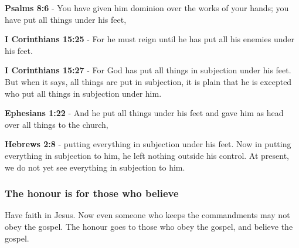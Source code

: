 \documentclass[11pt]{article}
\begin{document}
\textbf{Psalms 8:6} - You have given him dominion over the works of your hands; you have put all things under his feet,

\textbf{I Corinthians 15:25} - For he must reign until he has put all his enemies under his feet.

\textbf{I Corinthians 15:27} - For God has put all things in subjection under his feet. But when it says, all things are put in subjection, it is plain that he is excepted who put all things in subjection under him.

\textbf{Ephesians 1:22} - And he put all things under his feet and gave him as head over all things to the church,

\textbf{Hebrews 2:8} - putting everything in subjection under his feet. Now in putting everything in subjection to him, he left nothing outside his control. At present, we do not yet see everything in subjection to him.

\subsubsection{The honour is for those who believe}
\label{sec:org977fd52}
Have faith in Jesus.
Now even someone who keeps the commandments may not obey the gospel.
The honour goes to those who obey the gospel, and believe the gospel.
\end{document}
